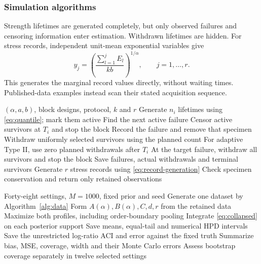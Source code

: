 \subsubsection{Simulation algorithms}\label{sec:generation}
Strength lifetimes are generated completely, but only observed failures and censoring information enter estimation. Withdrawn lifetimes are hidden. For stress records, independent unit-mean exponential variables give
\begin{equation}
y_j=\left(\frac{\sum_{l=1}^{j}E_l}{kb}\right)^{1/\alpha},\qquad j=1,\ldots,r.\label{eq:record-generation}
\end{equation}
This generates the marginal record values directly, without waiting times. Published-data examples instead scan their stated acquisition sequence.

\begin{algorithm}[htbp]
\caption{Generate one retained dataset}\label{alg:data}
\begin{algorithmic}[1]
\REQUIRE $(\alpha,a,b)$, block designs, protocol, $k$ and $r$
\STATE Generate $n_i$ lifetimes using \eqref{eq:quantile}; mark them active
\STATE Find the next active failure
\STATE Censor active survivors at $T_i$ and stop the block
\ELSE
\STATE Record the failure and remove that specimen
\STATE Withdraw uniformly selected survivors using the planned count
\STATE For adaptive Type II, use zero planned withdrawals after $T_i$
\STATE At the target failure, withdraw all survivors and stop the block
\ENDIF
\ENDWHILE
\STATE Save failures, actual withdrawals and terminal survivors
\ENDFOR
\STATE Generate $r$ stress records using \eqref{eq:record-generation}
\STATE Check specimen conservation and return only retained observations
\end{algorithmic}
\end{algorithm}

\begin{algorithm}[htbp]
\caption{Compare the four estimators}\label{alg:simulation}
\begin{algorithmic}[1]
\REQUIRE Forty-eight settings, $M=1000$, fixed prior and seed
\STATE Generate one dataset by Algorithm~\ref{alg:data}
\STATE Form $A(\alpha),B(\alpha),C,d,r$ from the retained data
\STATE Maximize both profiles, including order-boundary pooling
\STATE Integrate \eqref{eq:collapsed} on each posterior support
\STATE Save means, equal-tail and numerical HPD intervals
\STATE Save the unrestricted log-ratio ACI and error against the fixed truth
\ENDFOR
\STATE Summarize bias, MSE, coverage, width and their Monte Carlo errors
\STATE Assess bootstrap coverage separately in twelve selected settings
\end{algorithmic}
\end{algorithm}

